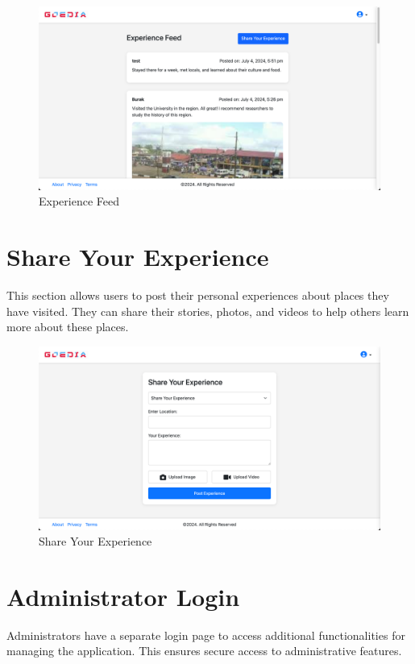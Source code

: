 \begin{figure}[H]
    \centering
    \includegraphics[width=\textwidth]{experienceFeed.png}
    \caption{Experience Feed}
    \label{fig:experienceFeed}
\end{figure}

\section{Share Your Experience}
This section allows users to post their personal experiences about places they have visited. They can share their stories, photos, and videos to help others learn more about these places.

\begin{figure}[H]
    \centering
    \includegraphics[width=\textwidth]{shareYourexperience.png}
    \caption{Share Your Experience}
    \label{fig:shareYourexperience}
\end{figure}

\section{Administrator Login}
Administrators have a separate login page to access additional functionalities for managing the application. This ensures secure access to administrative features.

